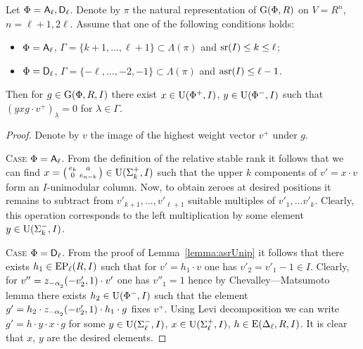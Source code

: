 \begin{lemma} \label{lemma:uraction} 
Let $\Phi=\mathsf{A}_\ell, \mathsf{D}_\ell$. Denote by $\pi$ the natural representation of $\operatorname{G}(\Phi, R)$ on $V=R^n$, $n=\ell+1,2\ell$.
Assume that one of the following conditions holds:
\begin{itemize}
 \item $\Phi=\mathsf{A}_\ell$, $\Gamma=\{ k+1, \ldots, \ell+1\} \subset \Lambda(\pi)$ and $\operatorname{sr}(I)\leq k\leq \ell$;
 \item $\Phi=\mathsf{D}_\ell$, $\Gamma=\{-\ell,\ldots, -2, -1\} \subset \Lambda(\pi)$ and $\operatorname{asr}(I)\leq \ell-1$. 
\end{itemize}
Then for $g\in \operatorname{G}(\Phi, R, I)$ there exist $x\in \operatorname{U}(\Phi^+, I)$, $y\in \operatorname{U}(\Phi^-, I)$ such that $(yxg \cdot v^+)_\lambda = 0$ for $\lambda\in \Gamma$.
\end{lemma}
\begin{proof} Denote by $v$ the image of the highest weight vector $v^+$ under $g$.

\textsc{Case $\Phi=\mathsf{A}_\ell$.} From the definition of the relative stable rank it follows that we can find 
$x= \left(\begin{smallmatrix} e_k & a \\ 0 & e_{n-k} \end{smallmatrix}\right) \in \operatorname{U}(\Sigma_k^+, I)$ such that 
the upper $k$ components of $v'= x \cdot v$ form an $I$-unimodular column. 
Now, to obtain zeroes at desired positions it remains to subtract from $v'_{k+1},\ldots, v'_{\ell+1}$ suitable multiples of $v'_1,\ldots v'_k$.
Clearly, this operation corresponds to the left multiplication by some element $y\in\operatorname{U}(\Sigma_k^-, I)$.

\textsc{Case $\Phi=\mathsf{D}_\ell$.} From the proof of Lemma~\ref{lemma:asrUnip} it follows that there exists $h_1 \in \operatorname{EP}_\ell(R, I)$ such that for $v'=h_1\cdot v$ one has $v'_2=v'_1-1\in I$.
Clearly, for $v'' = z_{-\alpha\ssub{2}}(-v'_2, 1)\cdot v'$ one has $v''_1=1$ hence by Chevalley---Matsumoto lemma there exists $h_2 \in \operatorname{U}(\Phi^-, I)$ such that the element
$g'=h_2 \cdot z_{-\alpha\ssub{2}}(-v'_2, 1) \cdot h_1 \cdot g$ fixes $v^+$. 
Using Levi decomposition we can write $g'=h \cdot y \cdot x \cdot g$ for some $y\in\operatorname{U}(\Sigma^-_\ell, I)$, $x \in \operatorname{U}(\Sigma^+_\ell, I)$, $h\in\operatorname{E}(\Delta_\ell, R, I)$.
It is clear that $x$, $y$ are the desired elements.
\end{proof}